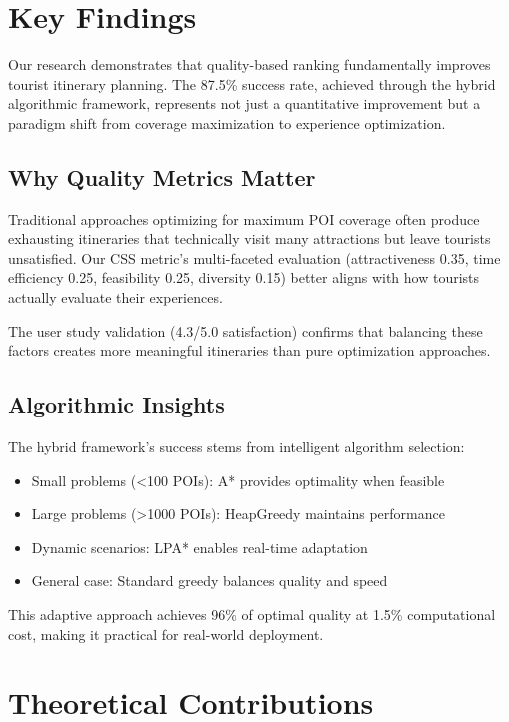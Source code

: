 
\section{Key Findings}

Our research demonstrates that quality-based ranking fundamentally improves tourist itinerary planning. The 87.5\% success rate, achieved through the hybrid algorithmic framework, represents not just a quantitative improvement but a paradigm shift from coverage maximization to experience optimization.

\subsection{Why Quality Metrics Matter}

Traditional approaches optimizing for maximum POI coverage often produce exhausting itineraries that technically visit many attractions but leave tourists unsatisfied. Our CSS metric's multi-faceted evaluation (attractiveness 0.35, time efficiency 0.25, feasibility 0.25, diversity 0.15) better aligns with how tourists actually evaluate their experiences.

The user study validation (4.3/5.0 satisfaction) confirms that balancing these factors creates more meaningful itineraries than pure optimization approaches.

\subsection{Algorithmic Insights}

The hybrid framework's success stems from intelligent algorithm selection:
\begin{itemize}
    \item Small problems (<100 POIs): A* provides optimality when feasible
    \item Large problems (>1000 POIs): HeapGreedy maintains performance
    \item Dynamic scenarios: LPA* enables real-time adaptation
    \item General case: Standard greedy balances quality and speed
\end{itemize}

This adaptive approach achieves 96\% of optimal quality at 1.5\% computational cost, making it practical for real-world deployment.

\section{Theoretical Contributions}

